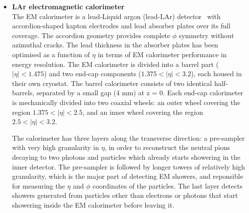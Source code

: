 \documentclass[letterpaper,12pt]{article}
\begin{document}
	\begin{itemize}
		\item \textbf{LAr electromagnetic calorimeter} \\
		The EM calorimeter is a 
		lead-Liquid argon (lead-LAr) detector~\cite{ATLAS-TDR-02} with accordion-shaped kapton electrodes and lead 
		absorber plates over its full coverage. The accordion geometry provides 
		complete $\phi$ symmetry without azimuthal cracks. The lead thickness in 
		the absorber plates has been optimised as a function of $\eta$ in terms of EM calorimeter
		performance in energy resolution. 
		The EM calorimeter is divided into a barrel part ($|\eta| < 1.475$) 
		and two end-cap components ($1.375 < |\eta|< 3.2$), each housed 
		in their own cryostat.
		The barrel calorimeter
		consists of two identical half-barrels, separated by a small gap (4 mm) at z = 0. 
		Each end-cap calorimeter is mechanically divided into two coaxial wheels: 
		an outer wheel covering the region $1.375 < |\eta|< 2.5$, and an inner wheel 
		covering the region $2.5 < |\eta|< 3.2$.
		
		The calorimeter has three layers along the transverse direction:
		a pre-sampler with very high granularity in $\eta$, in order to 
		reconstruct the neutral pions decaying to two photons and particles 
		which already starts showering in the inner detector. 
		The pre-sampler is followed by longer towers of relatively 
		high granularity, which is the major part of detecting EM showers, 
		and reponsible for measuring the $\eta$ and $\phi$ coordinates of 
		the particles. The last layer detects showers generated from 
		particles other than electrons or photons that start showering 
		inside the EM calorimeter before leaving it.


\end{itemize}
\end{document}
